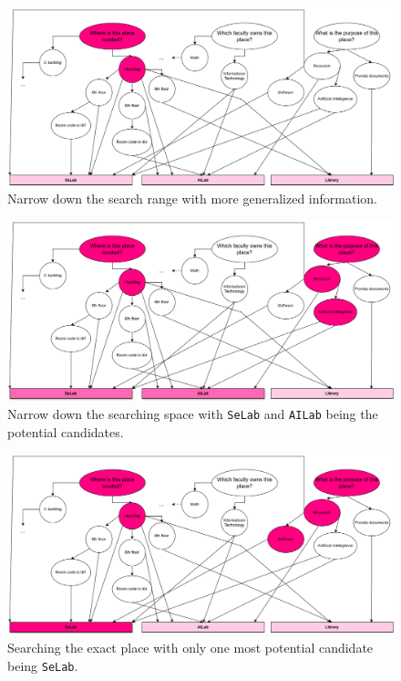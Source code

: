 \begin{figure}[ht]
  \centering
  \includegraphics[scale=0.2]{content/resources/images/chap-problems-solutions/data-management-6.png}
  \caption{Narrow down the search range with more generalized information.}
  \label{fig:data-management-6}
\end{figure}

\begin{figure}[ht]
  \centering
  \includegraphics[scale=0.2]{content/resources/images/chap-problems-solutions/data-management-7.png}
  \caption{Narrow down the searching space with \texttt{SeLab} and \texttt{AILab} being the potential candidates.}
  \label{fig:data-management-7}
\end{figure}

\begin{figure}[ht]
  \centering
  \includegraphics[scale=0.2]{content/resources/images/chap-problems-solutions/data-management-8.png}
  \caption{Searching the exact place with only one most potential candidate being \texttt{SeLab}.}
  \label{fig:data-management-8}
\end{figure}

